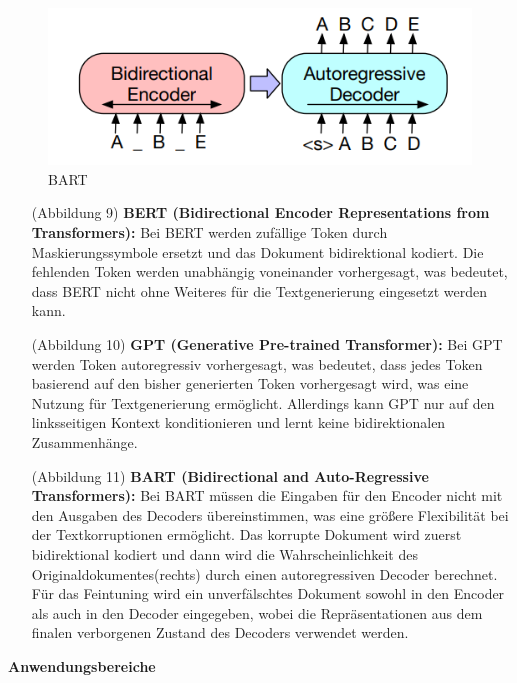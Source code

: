 \documentclass[12pt,a4paper,twoside]{article}
\begin{document}
\begin{figure}[H]
    \begin{minipage}[b]{0.4\linewidth}
        \includegraphics[width=\linewidth]{BART-Bart-erklaert.png}
        \caption{BART}
        \label{fig:bart}
    \end{minipage}
\end{figure}

\begin{itemize}
    \item[(Abbildung 9)] \textbf{BERT (Bidirectional Encoder Representations from Transformers):} Bei BERT werden zufällige Token durch Maskierungssymbole ersetzt und das Dokument bidirektional kodiert. Die fehlenden Token werden unabhängig voneinander vorhergesagt, was bedeutet, dass BERT nicht ohne Weiteres für die Textgenerierung eingesetzt werden kann.

    \item[(Abbildung 10)] \textbf{GPT (Generative Pre-trained Transformer):} Bei GPT werden Token autoregressiv vorhergesagt, was bedeutet, dass jedes Token basierend auf den bisher generierten Token vorhergesagt wird, was eine Nutzung für Textgenerierung ermöglicht. Allerdings kann GPT nur auf den linksseitigen Kontext konditionieren und lernt keine bidirektionalen Zusammenhänge.

    \item[(Abbildung 11)] \textbf{BART (Bidirectional and Auto-Regressive Transformers):} Bei BART müssen die Eingaben für den Encoder nicht mit den Ausgaben des Decoders übereinstimmen, was eine größere Flexibilität bei der Textkorruptionen ermöglicht. Das korrupte Dokument wird zuerst bidirektional kodiert und dann wird die Wahrscheinlichkeit des Originaldokumentes(rechts) durch einen autoregressiven Decoder berechnet. Für das Feintuning wird ein unverfälschtes Dokument sowohl in den Encoder als auch in den Decoder eingegeben, wobei die Repräsentationen aus dem finalen verborgenen Zustand des Decoders verwendet werden.
\end{itemize}

\textbf{Anwendungsbereiche}\\
\end{document}
